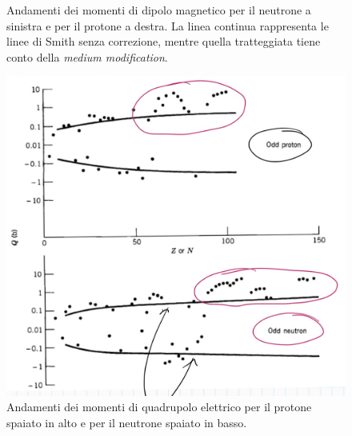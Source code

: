 \begin{figure}[!h]
    \caption{Andamenti dei momenti di dipolo magnetico per il neutrone a sinistra e per il protone a destra. La linea continua rappresenta le linee di Smith senza correzione, mentre quella tratteggiata tiene conto della \textit{medium modification}.}
    \label{curve}
\end{figure}

\begin{figure}[!h]
    \centering
    \includegraphics[scale=0.2]{Immagini/andamenti.png}
    \caption{Andamenti dei momenti di quadrupolo elettrico per il protone spaiato in alto e per il neutrone spaiato in basso.}
    \label{Q}
\end{figure}